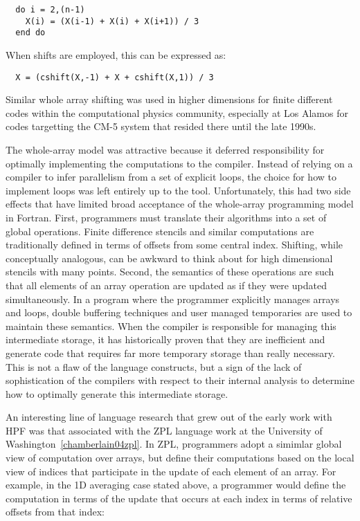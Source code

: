 {\small
\begin{verbatim}
  do i = 2,(n-1)
    X(i) = (X(i-1) + X(i) + X(i+1)) / 3
  end do
\end{verbatim}
}

When shifts are employed, this can be expressed as:

{\small
\begin{verbatim}
  X = (cshift(X,-1) + X + cshift(X,1)) / 3
\end{verbatim}
}

Similar whole array shifting was used in higher dimensions for finite
different codes within the computational physics community, especially
at Los Alamos for codes targetting the CM-5 system that resided there until the
late 1990s.  

The whole-array model was attractive because it deferred
responsibility for optimally implementing the computations to the
compiler.  Instead of relying on a compiler to infer parallelism from
a set of explicit loops, the choice for how to implement loops was
left entirely up to the tool.  Unfortunately, this had two side
effects that have limited broad acceptance of the whole-array
programming model in Fortran.  First, programmers must translate their
algorithms into a set of global operations.  Finite difference
stencils and similar computations are traditionally defined in terms
of offsets from some central index.  Shifting, while conceptually
analogous, can be awkward to think about for high dimensional stencils
with many points.  Second, the semantics of these operations are such
that all elements of an array operation are updated as if they were
updated simultaneously.  In a program where the programmer explicitly
manages arrays and loops, double buffering techniques and user managed
temporaries are used to maintain these semantics.  When the compiler
is responsible for managing this intermediate storage, it has
historically proven that they are inefficient and generate code that
requires far more temporary storage than really necessary.  This is
not a flaw of the language constructs, but a sign of the lack of
sophistication of the compilers with respect to their internal
analysis to determine how to optimally generate this intermediate
storage.

An interesting line of language research that grew out of the early work
with HPF was that associated with the ZPL language work at the University
of Washington~\ref{chamberlain04zpl}.  In ZPL, programmers adopt a simimlar
global view of computation over arrays, but define their computations based
on the local view of indices that participate in the update of each element of
an array.  For example, in the 1D averaging case stated above, a programmer would
define the computation in terms of the update that occurs at each index in terms
of relative offsets from that index:

